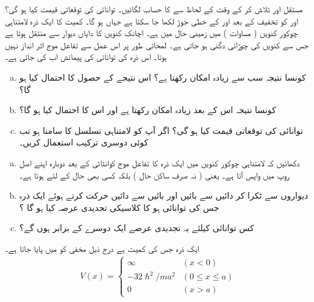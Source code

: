  مستقل اور  تلاش کر کے وقت کے لحاظ سے  کا حساب لگائیں۔ توانائی کی توقعاتی قیمت کیا ہو گی؟   اور  کو تخفیف کے بعد اور کے خطی جوڑ لکھا جا سکتا ہے جہاں  ہو گا۔
 کمیت کا ایک ذرہ لامتناہی چوکور کنویں ( مساوات ) میں زمینی حال میں ہے۔ اچانک کنویں کا دایاں دیوار  سے  منتقل ہوتا ہے جس سے کنویں کی چوڑائی دگنی ہو جاتی ہے۔ لمحاتی طور پر اس عمل سے تفاعل موج اثر انداز نہیں ہوتا۔ اس ذرہ کی توانائی کی پیمائش اب کی جاتی ہے۔
\begin{enumerate}[a.]
\item
 کونسا نتیجہ سب سے زیادہ امکان رکھتا ہے؟ اس نتیجے کے حصول کا احتمال کیا ہو گا؟ 
\item
 کونسا نتیجہ اس کے بعد زیادہ امکان رکھتا ہے اور اس کا احتمال کیا ہو گا؟
\item 
توانائی کی توقعاتی قیمت کیا ہو گی؟  اگر آپ کو لامتناہی تسلسل کا سامنا ہو تب کوئی دوسری ترکیب استعمال کریں۔
\end{enumerate} 
\begin{enumerate}[a.]
\item 
 دکھائیں کہ لامتناہی چوکور کنویں میں ایک ذرہ کا تفاعل موج کوانٹائی  کے بعد دوبارہ اپنے اصل روپ میں واپس آتا ہے۔ یعنی ( نہ صرف ساکن حال ) بلکہ کسی بھی حال کے لئے  ہوتا ہے۔ 
\item 
 دیواروں سے ٹکرا کر دائیں سے بائیں اور بائیں سے دائیں حرکت کرتے ہوئے ایک ذرہ جس کی توانائی  ہو کا کلاسیکی تجدیدی عرصہ کیا ہو گا ؟ 
\item 
 کس توانائی کیلئے یہ تجدیدی عرصے ایک دوسرے کے برابر ہوں گے؟
\end{enumerate} 
 ایک ذرہ جس کی کمیت  ہے درج ذیل مخفی کو میں پایا جاتا ہے۔ 
\begin{align*}
V(x)=
\begin{cases}
\infty & (x< 0)\\
-32\hslash^{2}/ma^{2} & (0\le x \le a)\\
0 & (x> a)
\end{cases}
\end{align*}

